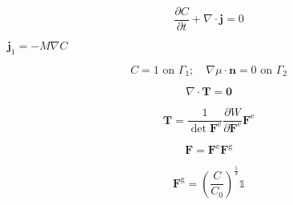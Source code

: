 \documentclass{article}
\begin{document}
\[ \frac{\partial C}{\partial t}+\nabla\cdot\boldsymbol{j}=0 \]
\pagebreak

$\boldsymbol{j}_1=-M\nabla C$
\pagebreak

\[ C=1 \text{ on }\Gamma_1; \quad \nabla \mu\cdot\boldsymbol{n}=0 \text{ on }\Gamma_2 \]
\pagebreak

\[ \nabla\cdot\boldsymbol{T} = \boldsymbol{0} \]
\pagebreak

\[ \boldsymbol{T}= \frac{1}{\det{\boldsymbol{F}^{\text{e}}}}\frac{\partial W}{\partial \boldsymbol{F}^{\text{e}}}\boldsymbol{F}^{\text{e}} \]
\pagebreak

\[ \boldsymbol{F}=\boldsymbol{F}^{\text{e}}\boldsymbol{F}^{\text{g}} \]
\pagebreak

\[ \boldsymbol{F}^{\text{g}}=\left(\frac{C}{C_\text{0}}\right)^{\frac{1}{3}}\mathbb{1} \]
\pagebreak
\end{document}
